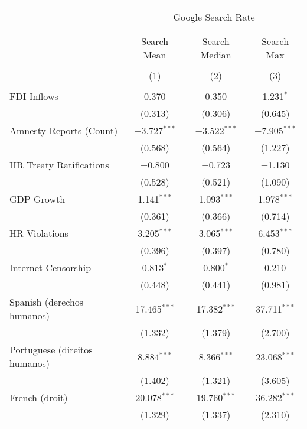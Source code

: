
\begin{table}[!htbp] \centering 
  \caption{} 
  \label{} 
\begin{tabular}{@{\extracolsep{5pt}}lccc} 
\\[-1.8ex]\hline 
\hline \\[-1.8ex] 
 & \multicolumn{3}{c}{Google Search Rate} \\ 
\cline{2-4} 
\\[-1.8ex] & \multicolumn{3}{c}{ } \\ 
 & Search Mean & Search Median & Search Max \\ 
\\[-1.8ex] & (1) & (2) & (3)\\ 
\hline \\[-1.8ex] 
 FDI Inflows & 0.370 & 0.350 & 1.231$^{*}$ \\ 
  & (0.313) & (0.306) & (0.645) \\ 
  Amnesty Reports (Count) & $-$3.727$^{***}$ & $-$3.522$^{***}$ & $-$7.905$^{***}$ \\ 
  & (0.568) & (0.564) & (1.227) \\ 
  HR Treaty Ratifications & $-$0.800 & $-$0.723 & $-$1.130 \\ 
  & (0.528) & (0.521) & (1.090) \\ 
  GDP Growth & 1.141$^{***}$ & 1.093$^{***}$ & 1.978$^{***}$ \\ 
  & (0.361) & (0.366) & (0.714) \\ 
  HR Violations & 3.205$^{***}$ & 3.065$^{***}$ & 6.453$^{***}$ \\ 
  & (0.396) & (0.397) & (0.780) \\ 
  Internet Censorship & 0.813$^{*}$ & 0.800$^{*}$ & 0.210 \\ 
  & (0.448) & (0.441) & (0.981) \\ 
  Spanish (derechos humanos) & 17.465$^{***}$ & 17.382$^{***}$ & 37.711$^{***}$ \\ 
  & (1.332) & (1.379) & (2.700) \\ 
  Portuguese (direitos humanos) & 8.884$^{***}$ & 8.366$^{***}$ & 23.068$^{***}$ \\ 
  & (1.402) & (1.321) & (3.605) \\ 
  French (droit) & 20.078$^{***}$ & 19.760$^{***}$ & 36.282$^{***}$ \\ 
  & (1.329) & (1.337) & (2.310) \\ 

\end{tabular}
\end{table}
